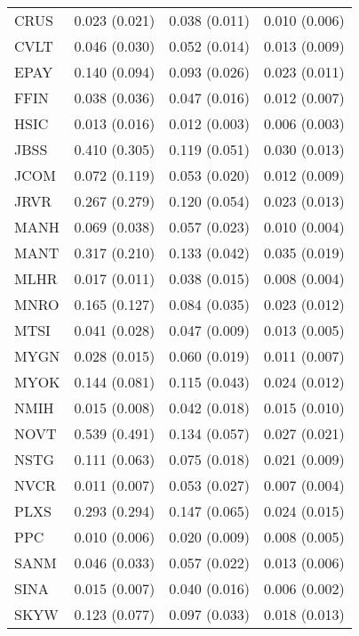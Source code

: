 \begin{table}
\begin{tabular}{llll}
  CRUS &  0.023 (0.021) &     0.038 (0.011) &  0.010 (0.006) \\
  CVLT &  0.046 (0.030) &     0.052 (0.014) &  0.013 (0.009) \\
  EPAY &  0.140 (0.094) &     0.093 (0.026) &  0.023 (0.011) \\
  FFIN &  0.038 (0.036) &     0.047 (0.016) &  0.012 (0.007) \\
  HSIC &  0.013 (0.016) &     0.012 (0.003) &  0.006 (0.003) \\
  JBSS &  0.410 (0.305) &     0.119 (0.051) &  0.030 (0.013) \\
  JCOM &  0.072 (0.119) &     0.053 (0.020) &  0.012 (0.009) \\
  JRVR &  0.267 (0.279) &     0.120 (0.054) &  0.023 (0.013) \\
  MANH &  0.069 (0.038) &     0.057 (0.023) &  0.010 (0.004) \\
  MANT &  0.317 (0.210) &     0.133 (0.042) &  0.035 (0.019) \\
  MLHR &  0.017 (0.011) &     0.038 (0.015) &  0.008 (0.004) \\
  MNRO &  0.165 (0.127) &     0.084 (0.035) &  0.023 (0.012) \\
  MTSI &  0.041 (0.028) &     0.047 (0.009) &  0.013 (0.005) \\
  MYGN &  0.028 (0.015) &     0.060 (0.019) &  0.011 (0.007) \\
  MYOK &  0.144 (0.081) &     0.115 (0.043) &  0.024 (0.012) \\
  NMIH &  0.015 (0.008) &     0.042 (0.018) &  0.015 (0.010) \\
  NOVT &  0.539 (0.491) &     0.134 (0.057) &  0.027 (0.021) \\
  NSTG &  0.111 (0.063) &     0.075 (0.018) &  0.021 (0.009) \\
  NVCR &  0.011 (0.007) &     0.053 (0.027) &  0.007 (0.004) \\
  PLXS &  0.293 (0.294) &     0.147 (0.065) &  0.024 (0.015) \\
   PPC &  0.010 (0.006) &     0.020 (0.009) &  0.008 (0.005) \\
  SANM &  0.046 (0.033) &     0.057 (0.022) &  0.013 (0.006) \\
  SINA &  0.015 (0.007) &     0.040 (0.016) &  0.006 (0.002) \\
  SKYW &  0.123 (0.077) &     0.097 (0.033) &  0.018 (0.013) \\
\bottomrule
\end{tabular}
\end{table}

